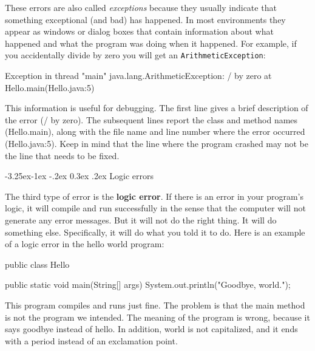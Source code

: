 \documentclass[12pt]{book}
\makeatletter
\renewcommand\subsection{\@startsection{subsection}{2}{\z@}%
    {-3.25ex\@plus -1ex \@minus -.2ex}%
    {0.3ex \@plus .2ex}%
    {\normalfont\large\bfseries}}
\theoremstyle{exercise}
\newcommand{\java}[1]{\lstinline{#1}} %
\makeatother
\begin{document}

These errors are also called {\em exceptions} because they usually indicate that something exceptional (and bad) has happened.
In most environments they appear as windows or dialog boxes that contain information about what happened and what the program was doing when it happened.
For example, if you accidentally divide by zero you will get an \java{ArithmeticException}:

\begin{small}
\begin{stdout}
Exception in thread "main" java.lang.ArithmeticException: / by zero
    at Hello.main(Hello.java:5)
\end{stdout}
\end{small}

This information is useful for debugging.
The first line gives a brief description of the error (/ by zero).
The subsequent lines report the class and method names (Hello.main), along with the file name and line number where the error occurred (Hello.java:5).
Keep in mind that the line where the program crashed may not be the line that needs to be fixed.

\subsection{Logic errors}


The third type of error is the {\bf logic error}.
If there is an error in your program's logic, it will compile and run successfully in the sense that the computer will not generate any error messages.
But it will not do the right thing.
It will do something else.
Specifically, it will do what you told it to do.
Here is an example of a logic error in the hello world program:

\begin{code}
public class Hello {

    public static void main(String[] args) {
        System.out.println("Goodbye, world.");
    }

}
\end{code}

This program compiles and runs just fine.
The problem is that the main method is not the program we intended.
The meaning of the program is wrong, because it says goodbye instead of hello.
In addition, world is not capitalized, and it ends with a period instead of an exclamation point.
\end{document}
